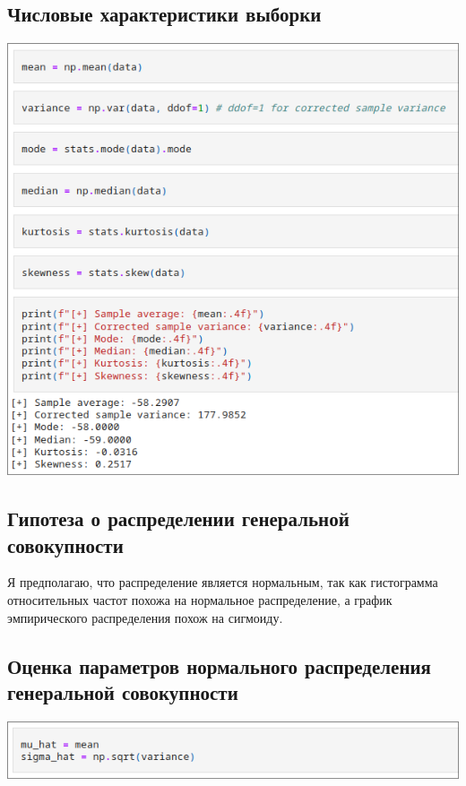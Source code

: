 \documentclass[a4paper]{article}
\begin{document}
    \subsection*{Числовые характеристики выборки}
    \includegraphics[width=\textwidth]{images/characteristics.png}

    \subsection*{Гипотеза о распределении генеральной совокупности}

    Я предполагаю, что распределение является нормальным, так как гистограмма относительных частот похожа на нормальное распределение, а график эмпирического распределения похож на сигмоиду.

    \subsection*{Оценка параметров нормального распределения генеральной совокупности}
    \includegraphics[width=\textwidth]{images/assessment.png}
\end{document}
